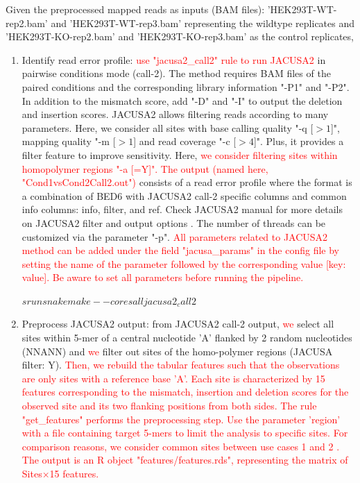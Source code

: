 \documentclass[times, 11pt, a4paper]{article}
\begin{document}
Given the preprocessed mapped reads as inputs (BAM files): 'HEK293T-WT-rep2.bam' and 'HEK293T-WT-rep3.bam' representing the wildtype replicates and 'HEK293T-KO-rep2.bam' and  'HEK293T-KO-rep3.bam' as the control replicates,
\begin{enumerate} 
	\item Identify read error profile:  \textcolor{red}{use "jacusa2\_call2" rule to run JACUSA2} in pairwise conditions mode (call-2). The method requires BAM files of the paired conditions and the corresponding library information "-P1" and "-P2". In addition to the mismatch score, add "-D" and "-I" to output the deletion and insertion scores. JACUSA2 allows filtering reads according to many parameters. Here, we consider all sites with base calling quality "-q [$>1$]", mapping quality "-m [$>1$] and read coverage "-c [$>4$]". Plus, it provides a filter feature to improve sensitivity. Here, \textcolor{red}{ we consider filtering sites within homopolymer regions "-a [=Y]". The output (named here, "Cond1vsCond2Call2.out")} consists of a read error profile where the format is a combination of BED6 with JACUSA2 call-2 specific columns and common info columns: info, filter, and ref. Check JACUSA2 manual for more details on JACUSA2 filter and output options \citep{JACUSA2manual}. The number of threads can be customized via the parameter "-p". \textcolor{red}{All parameters related to JACUSA2 method can be added under the field "jacusa\_params" in the config file by setting the name of the parameter followed by the corresponding value [key: value]. Be aware to set all parameters before running the pipeline. } 
	\begin{spverbatim}
	$ srun snakemake --cores all jacusa2_call2 	$
	\end{spverbatim}
	\item Preprocess JACUSA2 output: from JACUSA2 call-2 output, \textcolor{red}{we} select all sites within 5-mer of a central nucleotide 'A' flanked by 2 random nucleotides (NNANN) and \textcolor{red}{we} filter out sites of the homo-polymer regions (JACUSA filter: Y).
	 \textcolor{red}{Then, we rebuild the tabular features such that the observations are only sites with a reference base 'A'. Each site is characterized by 15 features corresponding to the mismatch, insertion and deletion scores for the observed site and its two flanking positions from both sides. 
	 The rule "get\_features" performs the preprocessing step. Use the parameter 'region' with a file containing target 5-mers to limit the analysis to specific sites. For comparison reasons, we consider common sites between use cases 1 and 2 . The output is an R object "features/features.rds", representing the matrix of Sites$\times$15 features. %
 }


\end{enumerate}
\end{document}
